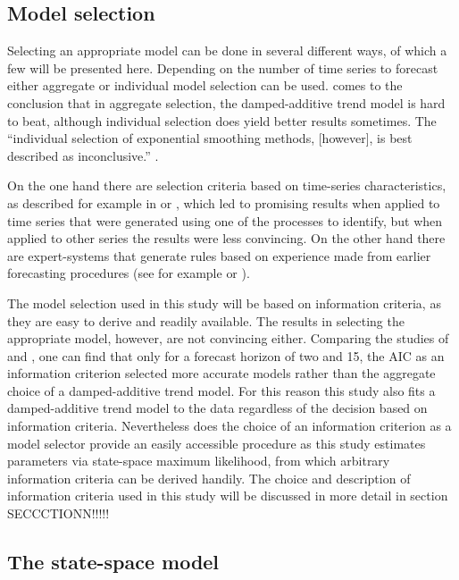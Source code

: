 \subsection{Model selection}

Selecting an appropriate model can be done in several different ways, of which a few will be presented here. Depending on the number of time series to forecast either aggregate or individual model selection can be used. \citet{fildes2001beyond} comes to the conclusion that in aggregate selection, the damped-additive trend model is hard to beat, although individual selection does yield better results sometimes. The \enquote{individual selection of exponential smoothing methods, [however], is best described as inconclusive.} \citep[][p. 28]{gardner2006exponential}.

On the one hand there are selection criteria based on time-series characteristics, as described for example in \citet{shah1997model} or \citet{meade2000evidence}, which led to promising results when applied to time series that were generated using one of the processes to identify, but when applied to other series the results were less convincing. On the other hand there are expert-systems that generate rules based on experience made from earlier forecasting procedures (see for example \citet{collopy1992rule} or \citet{flores2000use}). 

The model selection used in this study will be based on information criteria, as they are easy to derive and readily available. The results in selecting the appropriate model, however, are not convincing either. Comparing the studies of \citet{gardner1985forecasting} and \citet{hyndman2002state}, one can find that only for a forecast horizon of two and 15, the AIC as an information criterion selected more accurate models rather than the aggregate choice of a damped-additive trend model. For this reason this study also fits a damped-additive trend model to the data regardless of the decision based on information criteria. Nevertheless does the choice of an information criterion as a model selector provide an easily accessible procedure as this study estimates parameters via state-space maximum likelihood, from which arbitrary information criteria can be derived handily. The choice and description of information criteria used in this study will be discussed in more detail in section SECCCTIONN!!!!!

\subsection{The state-space model}

